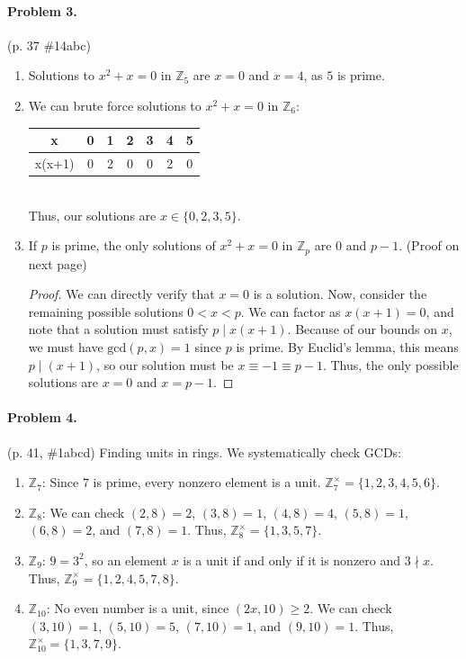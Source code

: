 \documentclass[12pt]{article}
\begin{document}
\paragraph{Problem 3.} (p. 37 \#14abc)
\begin{enumerate}
\item[a] {
    Solutions to $x^2 + x = 0$ in $\mathbb Z_5$ are $x = 0$ and $x = 4$, as $5$ is prime.
}
\item[b] {
    We can brute force solutions to $x^2 + x = 0$ in $\mathbb Z_6$:
    \begin{tabular}{c|c|c|c|c|c|c }
        x & 0 & 1 & 2 & 3 & 4 & 5 \\ \hline
        x(x+1) & 0 & 2 & 0 & 0 & 2 & 0
    \end{tabular} \\
    Thus, our solutions are $x \in \{0, 2, 3, 5\}$.
}
\item[c] {
    If $p$ is prime, the only solutions of $x^2 + x = 0$ in $\mathbb Z_p$ are $0$ and $p-1$. (Proof on next page)

    \begin{proof}
        We can directly verify that $x = 0$ is a solution. Now, consider the remaining possible solutions $0 < x < p$. We can factor as $x(x+1) = 0$, and note that a solution must satisfy $p \mid x(x+1)$. Because of our bounds on $x$, we must have $\mathrm{gcd}(p, x) = 1$ since $p$ is prime. By Euclid's lemma, this means $p \mid (x + 1)$, so our solution must be $x \equiv -1 \equiv p - 1$. Thus, the only possible solutions are $x = 0$ and $x = p-1$.
    \end{proof}
}
\end{enumerate}

\paragraph{Problem 4.} (p. 41, \#1abcd) Finding units in rings. We systematically check GCDs:
\begin{enumerate}
\item[a] {
    $\mathbb Z_7$: Since $7$ is prime, every nonzero element is a unit. $\mathbb Z_7^\times = \{1,2,3,4,5,6\}$.
}
\item[b] {
    $\mathbb Z_8$: We can check $(2,8) =2$, $(3, 8) = 1$, $(4, 8) = 4$, $(5, 8) = 1$, $(6, 8) = 2$, and $(7, 8) = 1$. Thus, $\mathbb Z_8^\times = \{1, 3, 5, 7\}$.
}
\item[c] {
    $\mathbb Z_9$: $9 = 3^2$, so an element $x$ is a unit if and only if it is nonzero and $3 \nmid x$. Thus, $\mathbb Z_9^\times = \{1, 2, 4, 5, 7, 8\}$.
}
\item[d] {
    $\mathbb Z_{10}$: No even number is a unit, since $(2x, 10) \ge 2$. We can check $(3, 10) = 1$, $(5, 10) = 5$, $(7, 10) = 1$, and $(9, 10) = 1$. Thus, $\mathbb Z_{10}^\times = \{1,3,7, 9\}$.
}
\end{enumerate}
\end{document}
